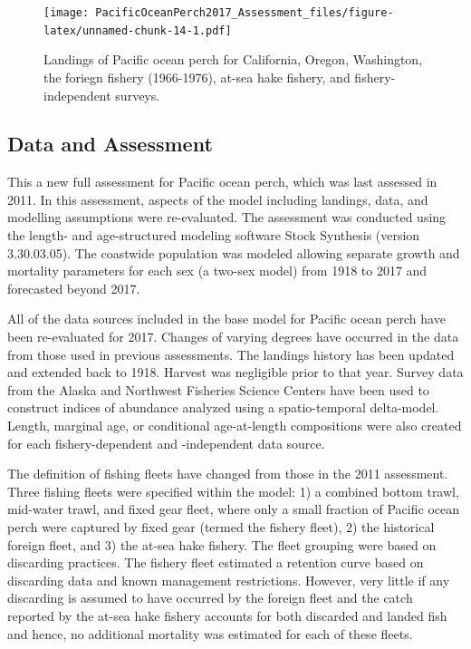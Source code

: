 \documentclass[12pt,]{article}
\begin{document}
\FloatBarrier

\begin{figure}
\centering
\texttt{[image: PacificOceanPerch2017\_Assessment\_files/figure-latex/unnamed-chunk-14-1.pdf]}
\caption{Landings of Pacific ocean perch for California, Oregon,
Washington, the foriegn fishery (1966-1976), at-sea hake fishery, and
fishery-independent surveys. \label{fig:Exec_catch1}}
\end{figure}

\FloatBarrier

\subsection*{Data and Assessment}\label{data-and-assessment}

This a new full assessment for Pacific ocean perch, which was last
assessed in 2011. In this assessment, aspects of the model including
landings, data, and modelling assumptions were re-evaluated. The
assessment was conducted using the length- and age-structured modeling
software Stock Synthesis (version 3.30.03.05). The coastwide population
was modeled allowing separate growth and mortality parameters for each
sex (a two-sex model) from 1918 to 2017 and forecasted beyond 2017.

All of the data sources included in the base model for Pacific ocean
perch have been re-evaluated for 2017. Changes of varying degrees have
occurred in the data from those used in previous assessments. The
landings history has been updated and extended back to 1918. Harvest was
negligible prior to that year. Survey data from the Alaska and Northwest
Fisheries Science Centers have been used to construct indices of
abundance analyzed using a spatio-temporal delta-model. Length, marginal
age, or conditional age-at-length compositions were also created for
each fishery-dependent and -independent data source.

The definition of fishing fleets have changed from those in the 2011
assessment. Three fishing fleets were specified within the model: 1) a
combined bottom trawl, mid-water trawl, and fixed gear fleet, where only
a small fraction of Pacific ocean perch were captured by fixed gear
(termed the fishery fleet), 2) the historical foreign fleet, and 3) the
at-sea hake fishery. The fleet grouping were based on discarding
practices. The fishery fleet estimated a retention curve based on
discarding data and known management restrictions. However, very little
if any discarding is assumed to have occurred by the foreign fleet and
the catch reported by the at-sea hake fishery accounts for both
discarded and landed fish and hence, no additional mortality was
estimated for each of these fleets.
\end{document}
